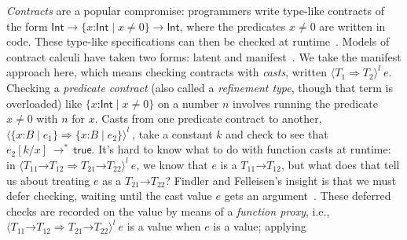 \documentclass[9pt]{extarticle}
\newcommand{\ottnt}[1]{\mathit{#1}}
\newcommand{\ottmv}[1]{\mathit{#1}}
\newcommand{\ottsym}[1]{#1}
\begin{document}
\textit{Contracts} are a popular compromise: programmers write
type-like contracts of the form $ \mathsf{Int}   \rightarrow   \{ \mathit{x} \mathord{:}  \mathsf{Int}  \mathrel{\mid}  \mathit{x}  \mathrel{\ne}  \ottsym{0}  \} 
 \rightarrow   \mathsf{Int} $, where the predicates $ \mathit{x}  \mathrel{\ne}  \ottsym{0} $ are written in
code. These type-like specifications can then be checked at
runtime~\cite{Findler02contracts}.
Models of contract calculi have taken two forms: latent and
manifest~\cite{Greenberg12contracts}. We take the manifest approach
here, which means checking contracts with \textit{casts}, written
$ \langle  \ottnt{T_{{\mathrm{1}}}}  \mathord{ \overset{    }{\Rightarrow} }  \ottnt{T_{{\mathrm{2}}}}  \rangle^{ \ottnt{l} } ~  \ottnt{e} $.
Checking a \textit{predicate contract} (also called a
\textit{refinement type}, though that term is overloaded) like
$ \{ \mathit{x} \mathord{:}  \mathsf{Int}  \mathrel{\mid}  \mathit{x}  \mathrel{\ne}  \ottsym{0}  \} $ on a number $\ottmv{n}$ involves running the
predicate $ \mathit{x}  \mathrel{\ne}  \ottsym{0} $ with $\ottmv{n}$ for $\mathit{x}$. Casts from one
predicate contract to another, $ \langle   \{ \mathit{x} \mathord{:} \ottnt{B} \mathrel{\mid} \ottnt{e_{{\mathrm{1}}}} \}   \mathord{ \overset{    }{\Rightarrow} }   \{ \mathit{x} \mathord{:} \ottnt{B} \mathrel{\mid} \ottnt{e_{{\mathrm{2}}}} \}   \rangle^{ \ottnt{l} } ~     $\!\!, take a constant $\ottnt{k}$ and check to see that $ \ottnt{e_{{\mathrm{2}}}}  [  \ottnt{k} / \mathit{x}  ]  \,  \longrightarrow ^{*}_{    }  \,  \mathsf{true} $.
It's hard to know what to do with function casts at runtime: in
$ \langle   \ottnt{T_{{\mathrm{11}}}} \mathord{ \rightarrow } \ottnt{T_{{\mathrm{12}}}}   \mathord{ \overset{    }{\Rightarrow} }   \ottnt{T_{{\mathrm{21}}}} \mathord{ \rightarrow } \ottnt{T_{{\mathrm{22}}}}   \rangle^{ \ottnt{l} } ~  \ottnt{e} $, we know that $\ottnt{e}$ is a
$ \ottnt{T_{{\mathrm{11}}}} \mathord{ \rightarrow } \ottnt{T_{{\mathrm{12}}}} $, but what does that tell us about treating $\ottnt{e}$ as a
$ \ottnt{T_{{\mathrm{21}}}} \mathord{ \rightarrow } \ottnt{T_{{\mathrm{22}}}} $? Findler and Felleisen's insight is that we must defer
checking, waiting until the cast value $\ottnt{e}$ gets an
argument~\cite{Findler02contracts}. These deferred checks are recorded
on the value by means of a \textit{function proxy}, i.e., $ \langle   \ottnt{T_{{\mathrm{11}}}} \mathord{ \rightarrow } \ottnt{T_{{\mathrm{12}}}}   \mathord{ \overset{    }{\Rightarrow} }   \ottnt{T_{{\mathrm{21}}}} \mathord{ \rightarrow } \ottnt{T_{{\mathrm{22}}}}   \rangle^{ \ottnt{l} } ~  \ottnt{e} $ is a value when $\ottnt{e}$ is a value; applying
\end{document}
